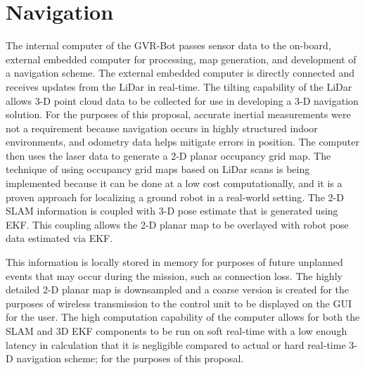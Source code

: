 \section{Navigation}\label{sec:navigation}

The internal computer of the GVR-Bot passes sensor data to the on-board, external embedded computer for processing, map generation, and development of a navigation scheme. The external embedded computer is directly connected and receives updates from the LiDar in real-time. The tilting capability of the LiDar allows 3-D point cloud data to be collected for use in developing a 3-D navigation solution. For the purposes of this proposal, accurate inertial measurements were not a requirement because navigation occurs in highly structured indoor environments, and odometry data helps mitigate errors in position. The computer then uses the laser data to generate a 2-D planar occupancy grid map. The technique of using occupancy grid maps based on LiDar scans is being implemented because it can be done at a low cost computationally, and it is a proven approach for localizing a ground robot in a real-world setting\cite{Probablistic Robotics 2005 MIT Press}. The 2-D SLAM information is coupled with 3-D pose estimate that is generated using EKF. This coupling allows the 2-D planar map to be overlayed with robot pose data estimated via EKF. 

This information is locally stored in memory for purposes of future unplanned events that may occur during the mission, such as connection loss. The highly detailed 2-D planar map is downsampled and a coarse version is created for the purposes of wireless transmission to the control unit to be displayed on the GUI for the user. The high computation capability of the computer allows for both the SLAM and 3D EKF components to be run on soft real-time with a low enough latency in calculation that it is negligible compared to actual or hard real-time 3-D navigation scheme; for the purposes of this proposal.